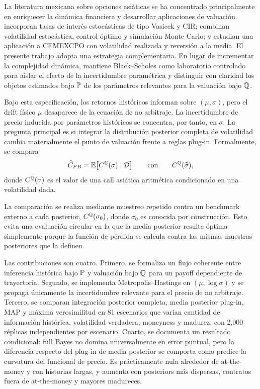 La literatura mexicana sobre opciones asiáticas se ha concentrado principalmente en enriquecer la dinámica financiera y desarrollar aplicaciones de valuación. \citet{ortiz2016} incorporan tasas de interés estocásticas de tipo Vasicek y CIR; \citet{matias2019} combinan volatilidad estocástica, control óptimo y simulación Monte Carlo; y \citet{ortizjimenez2026} estudian una aplicación a CEMEXCPO con volatilidad realizada y reversión a la media. El presente trabajo adopta una estrategia complementaria. En lugar de incrementar la complejidad dinámica, mantiene Black--Scholes como laboratorio controlado para aislar el efecto de la incertidumbre paramétrica y distinguir con claridad los objetos estimados bajo $\mathbb{P}$ de los parámetros relevantes para la valuación bajo $\mathbb{Q}$.

Bajo esta especificación, los retornos históricos informan sobre $(\mu,\sigma)$, pero el drift físico $\mu$ desaparece de la ecuación de no arbitraje. La incertidumbre de precio inducida por parámetros históricos se concentra, por tanto, en $\sigma$. La pregunta principal es si integrar la distribución posterior completa de volatilidad cambia materialmente el punto de valuación frente a reglas plug-in. Formalmente, se compara
\begin{equation}
 \widehat C_{FB}=\mathbb{E}\!\left[C^{\mathbb{Q}}(\sigma)\mid\mathcal D\right]
 \qquad\text{con}\qquad
 C^{\mathbb{Q}}(\widehat\sigma),
 \label{eq:main_question}
\end{equation}
donde $C^{\mathbb{Q}}(\sigma)$ es el valor de una call asiática aritmética condicionado en una volatilidad dada.

La comparación se realiza mediante muestreo repetido contra un benchmark externo a cada posterior, $C^{\mathbb{Q}}(\sigma_0)$, donde $\sigma_0$ es conocida por construcción. Esto evita una evaluación circular en la que la media posterior resulte óptima simplemente porque la función de pérdida se calcula contra las mismas muestras posteriores que la definen.

Las contribuciones son cuatro. Primero, se formaliza un flujo coherente entre inferencia histórica bajo $\mathbb{P}$ y valuación bajo $\mathbb{Q}$ para un payoff dependiente de trayectoria. Segundo, se implementa Metropolis--Hastings en $(\mu,\log\sigma)$ y se propaga únicamente la incertidumbre relevante para el precio de no arbitraje. Tercero, se comparan integración posterior completa, media posterior plug-in, MAP y máxima verosimilitud en 81 escenarios que varían cantidad de información histórica, volatilidad verdadera, moneyness y madurez, con 2,000 réplicas independientes por escenario. Cuarto, se documenta un resultado condicional: full Bayes no domina universalmente en error puntual, pero la diferencia respecto del plug-in de media posterior se comporta como predice la curvatura del funcional de precio. Es prácticamente nula alrededor de at-the-money y con historias largas, y aumenta con posteriors más dispersas, contratos fuera de at-the-money y mayores madureces.

